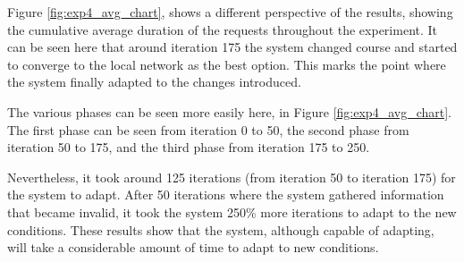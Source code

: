 Figure \ref{fig:exp4_avg_chart}, shows a different perspective of the results,
showing the cumulative average duration of the requests throughout the experiment.
It can be seen here that around iteration 175 the system changed course and
started to converge to the local network as the best option. This marks the point
where the system finally adapted to the changes introduced.

The various phases can be seen more easily here, in Figure
\ref{fig:exp4_avg_chart}. The first phase can be seen from iteration 0 to 50, the
second phase from iteration 50 to 175, and the third phase from iteration 175 to
250.

Nevertheless, it took around 125 iterations (from iteration 50 to iteration 175)
for the system to adapt. After 50 iterations where the system gathered information
that became invalid, it took the system 250\% more iterations to adapt to the new
conditions. These results show that the system, although capable of adapting, will
take a considerable amount of time to adapt to new conditions.
